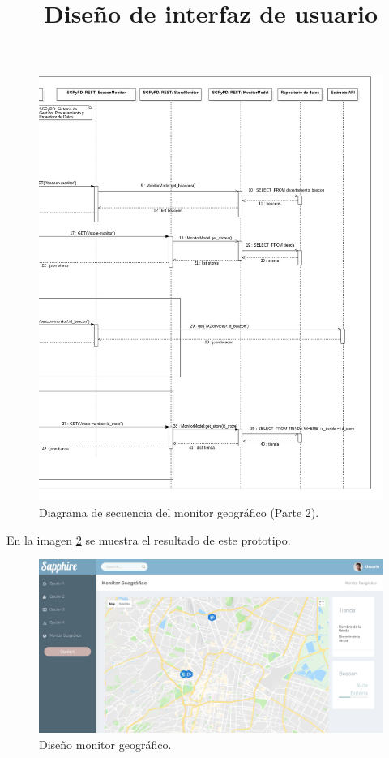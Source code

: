 \FloatBarrier
\begin{figure}[htbp!]
		\centering
			\includegraphics[width=1 \textwidth]{imagenes/DSRuben/MonitorGeografico_2}
		\caption{Diagrama de secuencia del monitor geográfico (Parte 2).}
		\label{DS:MonitorGeografico2}
\end{figure}
\FloatBarrier


\newpage
\title{\textbf{Diseño de interfaz de usuario \\}}
En la imagen \ref{diseniomonitorGeografico} se muestra el resultado de este prototipo.
\FloatBarrier
\begin{figure}[htbp!]
		\centering
			\includegraphics[width=1 \textwidth]{imagenes/UI/middlewareMonitorGeografico}
		\caption{Diseño monitor geográfico.}
		\label{diseniomonitorGeografico}
\end{figure}
\FloatBarrier

